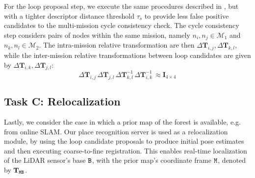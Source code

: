 For the loop proposal step, we execute the same procedures described in , but with a tighter descriptor distance threshold $\tau_{s}$ to provide less false positive candidates to the multi-mission cycle consistency check.
The cycle consistency step considers pairs of nodes within the same mission, namely $n_i, n_j \in \mathcal{M}_1$ and $n_k, n_l \in \mathcal{M}_2$. The intra-mission relative transformation are then $\Delta\mathbf{T}_{i,j}, \Delta\mathbf{T}_{k, l}$, while the inter-mission relative transformations between loop candidates are given by $\Delta\mathbf{T}_{i,k}, \Delta\mathbf{T}_{j,l}$:
\begin{equation}
  \label{eq:cycle-offline}
  \Delta\mathbf{T}_{i,j}\, \Delta\mathbf{T}_{j,l}\, \Delta\mathbf{T}_{k, l}^{-1}\, \Delta\mathbf{T}_{i,k}^{-1}\, \approx \mathbf{I}_{4\times4}
\end{equation}

\subsection{Task C: Relocalization} \label{sec:relocalization}
Lastly, we consider the case in which a prior map of the forest is available, e.g. from online SLAM. Our place recognition server is used as a relocalization module, by using the loop candidate proposals to produce initial pose estimates and then executing coarse-to-fine registration. This enables real-time localization of the LiDAR sensor's base $\mathtt{B}$, with the prior map's coordinate frame $\mathtt{M}$, denoted by $\mathbf{T}_{\mathtt{M}\mathtt{B}}$.

